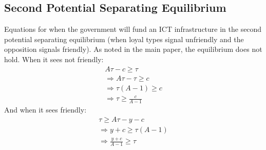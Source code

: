 \documentclass[12pt]{article}
\begin{document}
	\subsection{Second Potential Separating Equilibrium}
	Equations for when the government will fund an ICT infrastructure in the second potential separating equilibrium (when loyal types signal unfriendly and the opposition signals friendly). As noted in the main paper, the equilibrium does not hold. When it sees not friendly: \begin{gather*}A\tau - c \geq \tau \\ \Rightarrow A\tau - \tau \geq c \\ \Rightarrow \tau(A - 1) \geq c \\ \Rightarrow \tau \geq \frac{c}{A-1}\end{gather*} And when it sees friendly: \begin{gather*}\tau \geq A\tau - y - c \\ \Rightarrow y + c \geq \tau(A - 1) \\ \Rightarrow \frac{y + c}{A - 1} \geq \tau\end{gather*}
	
\end{document}
